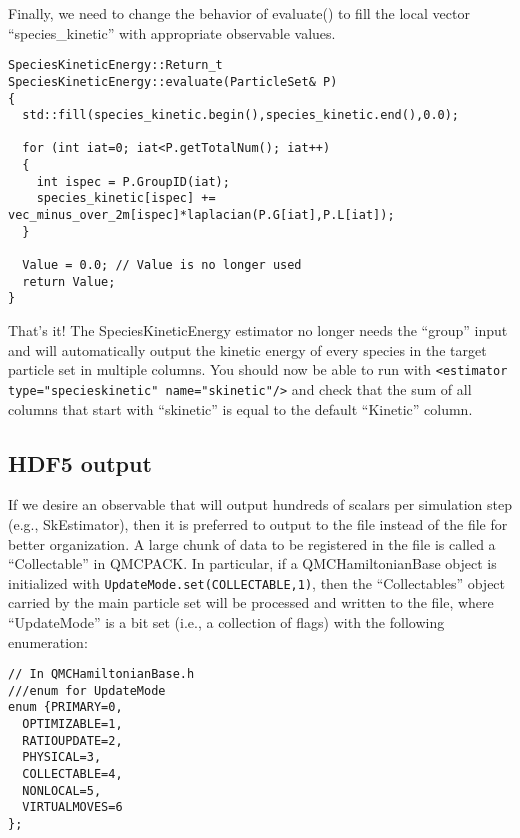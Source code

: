 Finally, we need to change the behavior of evaluate() to fill the local vector ``species\_kinetic'' with appropriate observable values.
\begin{lstlisting}[style=C++]
SpeciesKineticEnergy::Return_t SpeciesKineticEnergy::evaluate(ParticleSet& P)
{
  std::fill(species_kinetic.begin(),species_kinetic.end(),0.0);

  for (int iat=0; iat<P.getTotalNum(); iat++)
  {
    int ispec = P.GroupID(iat);
    species_kinetic[ispec] += vec_minus_over_2m[ispec]*laplacian(P.G[iat],P.L[iat]);
  }
  
  Value = 0.0; // Value is no longer used
  return Value;
}
\end{lstlisting}
That's it! The SpeciesKineticEnergy estimator no longer needs the ``group'' input and will automatically output the kinetic energy of every species in the target particle set in multiple columns. You should now be able to run with 
\verb|<estimator type="specieskinetic" name="skinetic"/>| and check that the sum of all columns that start with ``skinetic'' is equal to the default ``Kinetic'' column.

\subsection{HDF5 output}
If we desire an observable that will output hundreds of scalars per simulation step (e.g., SkEstimator), then it is preferred to output to the  file instead of the  file for better organization. A large chunk of data to be registered in the  file is called a ``Collectable'' in QMCPACK. In particular, if a QMCHamiltonianBase object is initialized with \verb|UpdateMode.set(COLLECTABLE,1)|, then the ``Collectables'' object carried by the main particle set will be processed and written to the  file, where ``UpdateMode'' is a bit set (i.e., a collection of flags) with the following enumeration:
\begin{lstlisting}[style=C++]
// In QMCHamiltonianBase.h
///enum for UpdateMode
enum {PRIMARY=0,
  OPTIMIZABLE=1,
  RATIOUPDATE=2,
  PHYSICAL=3,
  COLLECTABLE=4,
  NONLOCAL=5,
  VIRTUALMOVES=6
};
\end{lstlisting}

